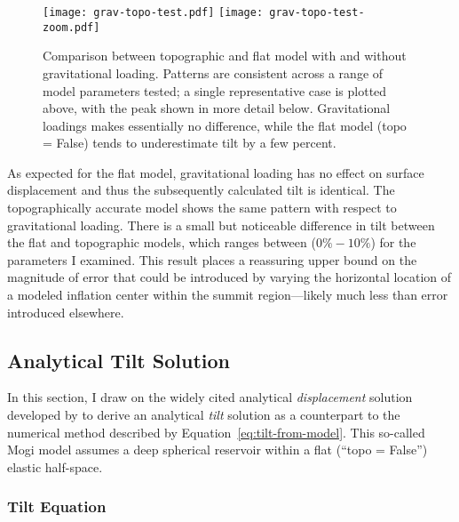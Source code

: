 \begin{figure}
    \texttt{[image: grav-topo-test.pdf]}
    \texttt{[image: grav-topo-test-zoom.pdf]}%
    \caption[Numerical model sensitivity to topography and gravity]{Comparison between topographic and flat model with and without gravitational loading. Patterns are consistent across a range of model parameters tested; a single representative case is plotted above, with the peak shown in more detail below. Gravitational loadings makes essentially no difference, while the flat model (topo = False) tends to underestimate tilt by a few percent.}%
    \label{fig:grav-topo-test}%
\end{figure}

As expected for the flat model, gravitational loading has no effect on surface displacement and thus the subsequently calculated tilt is identical. The topographically accurate model shows the same pattern with respect to gravitational loading. There is a small but noticeable difference in tilt between the flat and topographic models, which ranges between ($0\%-10\%$) for the parameters I examined. This result places a reassuring upper bound on the magnitude of error that could be introduced by varying the horizontal location of a modeled inflation center within the summit region---likely much less than error introduced elsewhere.

\subsection{Analytical Tilt Solution}

In this section, I draw on the widely cited analytical \emph{displacement} solution developed by \textcite{mogi_relations_1958} to derive an analytical \emph{tilt} solution as a counterpart to the numerical method described by Equation~\eqref{eq:tilt-from-model}. This so-called Mogi model assumes a deep spherical reservoir within a flat (``topo = False'') elastic half-space.

\subsubsection{Tilt Equation}

